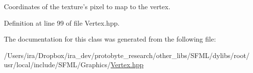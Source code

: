 Coordinates of the texture's pixel to map to the vertex. 



Definition at line 99 of file Vertex.\-hpp.



The documentation for this class was generated from the following file\-:\begin{DoxyCompactItemize}
\item 
/\-Users/ira/\-Dropbox/ira\-\_\-dev/protobyte\-\_\-research/other\-\_\-libs/\-S\-F\-M\-L/dylibs/root/usr/local/include/\-S\-F\-M\-L/\-Graphics/\hyperlink{_vertex_8hpp}{Vertex.\-hpp}\end{DoxyCompactItemize}
